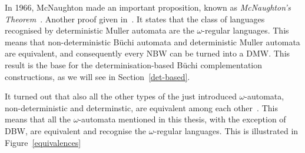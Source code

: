 \documentclass[a4paper]{report}
\newcommand{\om}{{$\omega$}}
\begin{document}
In 1966, McNaughton made an important proposition, known as \emph{McNaughton's Theorem}~\cite{McNaughton1966}. Another proof given in~\cite{Thomas:1991}. It states that the class of languages recognised by deterministic Muller automata are the \om-regular languages. This means that non-deterministic Büchi automata and deterministic Muller automata are equivalent, and consequently every NBW can be turned into a DMW. This result is the base for the determinisation-based Büchi complementation constructions, as we will see in Section~\ref{det-based}.

It turned out that also all the other types of the just introduced \om-automata, non-deterministic and determinstic, are equivalent among each other~\cite{2002_roggenbach}\cite{2006_klein}\cite{klein2005linear}\cite{1999_loeding}\cite{Thomas:1991}. This means that all the \om-automata mentioned in this thesis, with the exception of DBW, are equivalent and recognise the \om-regular languages. This is illustrated in Figure~\ref{equivalences}





\end{document}
